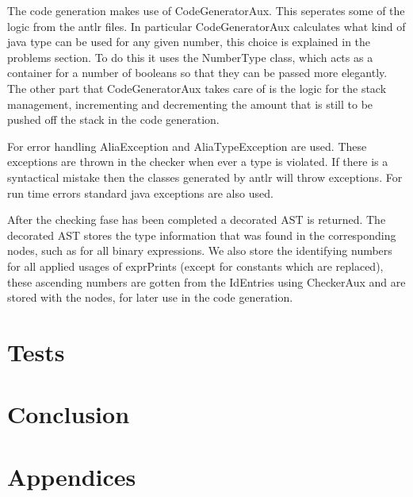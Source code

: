 \documentclass[paper=a4, fontsize=11pt]{article}
\numberwithin{equation}{section}		%
\numberwithin{figure}{section}			%
\numberwithin{table}{section}				%
\begin{document}
The code generation makes use of CodeGeneratorAux. This seperates some of the logic from the antlr files. In particular CodeGeneratorAux calculates what kind of java type can be used for any given number, this choice is explained in the problems section. To do this it uses the NumberType class, which acts as a container for a number of booleans so that they can be passed more elegantly. The other part that CodeGeneratorAux takes care of is the logic for the stack management, incrementing and decrementing the amount that is still to be pushed off the stack in the code generation.

For error handling AliaException and AliaTypeException are used. These exceptions are thrown in the checker when ever a type is violated. If there is a syntactical mistake then the classes generated by antlr will throw exceptions. For run time errors standard java exceptions are also used.

After the checking fase has been completed a decorated AST is returned. The decorated AST stores the type information that was found in the corresponding nodes, such as for all binary expressions. We also store the identifying numbers for all applied usages of exprPrints (except for constants which are replaced), these ascending numbers are gotten from the IdEntries using CheckerAux and are stored with the nodes, for later use in the code generation.
\section{Tests}

\section{Conclusion}
\section{Appendices}
% 
\end{document}
